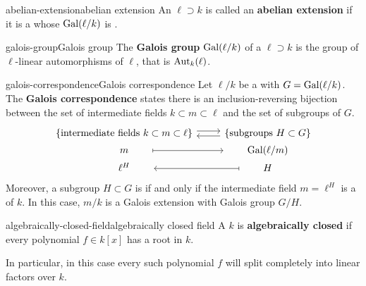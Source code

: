\begin{topic}{abelian-extension}{abelian extension}
    An   $\ell \supset k$ is called an \textbf{abelian extension} if it is a  whose  $\textup{Gal}(\ell/k)$ is .
\end{topic}

\begin{topic}{galois-group}{Galois group}
    The \textbf{Galois group} $\textup{Gal}(\ell/k)$ of a  $\ell \supset k$ is the group of $\ell$-linear automorphisms of $\ell$, that is $\textup{Aut}_k(\ell)$.
\end{topic}

\begin{topic}{galois-correspondence}{Galois correspondence}
    Let $\ell/k$ be a  with  $G = \textup{Gal}(\ell/k)$. The \textbf{Galois correspondence} states there is an inclusion-reversing bijection between the set of intermediate fields $k \subset m \subset \ell$ and the set of subgroups of $G$.
    \[ \begin{tikzcd}[row sep=0em]
        \{ \text{intermediate fields } k \subset m \subset \ell \} \arrow[shift left=0.25em]{r} & \arrow[shift left=0.25em]{l} \{ \text{subgroups } H \subset G \} \\
        \qquad m \qquad  \arrow[mapsto]{r} & \qquad \textup{Gal}(\ell/m) \qquad \\
        \qquad \ell^H \qquad & \arrow[mapsto]{l} \qquad H \qquad 
    \end{tikzcd} \]
    Moreover, a subgroup $H \subset G$ is  if and only if the intermediate field $m = \ell^H$ is a  of $k$. In this case, $m/k$ is a Galois extension with Galois group $G/H$.
\end{topic}

\begin{topic}{algebraically-closed-field}{algebraically closed field}
    A  $k$ is \textbf{algebraically closed} if every polynomial $f \in k[x]$ has a root in $k$.
    
    In particular, in this case every such polynomial $f$ will split completely into linear factors over $k$.
\end{topic}

